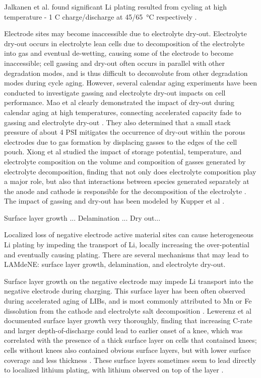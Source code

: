 \documentclass{article}
\begin{document}
Jalkanen et al. found significant Li plating resulted from cycling at high temperature - 1 C charge/discharge at \SI{45/65}{\celsius} respectively \cite{jalkanen_cycle_2015}. 

Electrode sites may become inaccessible due to electrolyte dry-out. Electrolyte dry-out occurs in electrolyte lean cells due to decomposition of the electrolyte into gas and eventual de-wetting, causing some of the electrode to become inaccessible; cell gassing and dry-out often occurs in parallel with other degradation modes, and is thus difficult to deconvolute from other degradation modes during cycle aging. However, several calendar aging experiments have been conducted to investigate gassing and electrolyte dry-out impacts on cell performance. Mao et al clearly demonstrated the impact of dry-out during calendar aging at high temperatures, connecting accelerated capacity fade to gassing and electrolyte dry-out \cite{mao_calendar_2017}. They also determined that a small stack pressure of about 4 PSI mitigates the occurrence of dry-out within the porous electrodes due to gas formation by displacing gasses to the edges of the cell pouch. Xiong et al studied the impact of storage potential, temperature, and electrolyte composition on the volume and composition of gasses generated by electrolyte decomposition, finding that not only does electrolyte composition play a major role, but also that interactions between species generated separately at the anode and cathode is responsible for the decomposition of the electrolyte \cite{xiong_studies_2017}.
The impact of gassing and dry-out has been modeled by Kupper et al \cite{kupper_end--life_2018}.

Surface layer growth ...
Delamination ...
Dry out...

Localized loss of negative electrode active material sites can cause heterogeneous Li plating by impeding the transport of Li, locally increasing the over-potential and eventually causing plating. There are several mechanisms that may lead to LAMdeNE: surface layer growth, delamination, and electrolyte dry-out.

Surface layer growth on the negative electrode may impede Li transport into the negative electrode during charging. This surface layer has been often observed during accelerated aging of LIBs, and is most commonly attributed to Mn or Fe dissolution from the cathode and electrolyte salt decomposition \cite{lewerenz_post-mortem_2017,lewerenz_systematic_2017,zhu_investigation_2021,stiaszny_electrochemical_2014,rahe_nanoscale_2019,keil_linear_2019,sarasketa-zabala_understanding_2015, willenberg_high-precision_2020}. Lewerenz et al documented surface layer growth very thoroughly, finding that increasing C-rate and larger depth-of-discharge could lead to earlier onset of a knee, which was correlated with the presence of a thick surface layer on cells that contained knees; cells without knees also contained obvious surface layers, but with lower surface coverage and less thickness \cite{lewerenz_post-mortem_2017,lewerenz_systematic_2017}. These surface layers sometimes seem to lead directly to localized lithium plating, with lithium observed on top of the layer \cite{zhu_investigation_2021}.
\end{document}

